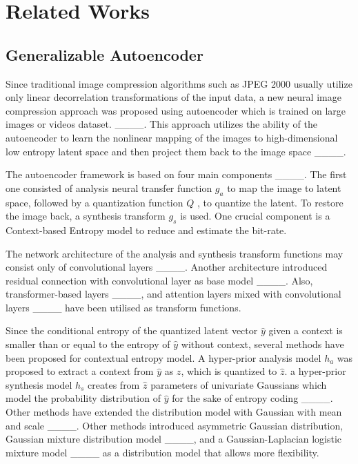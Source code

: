\section{Related Works}
\subsection{Generalizable Autoencoder}\label{sec:Generalizable_Autoencoder}

Since traditional image compression algorithms such as JPEG 2000 usually utilize only linear decorrelation transformations of the input data, a new neural image compression approach was proposed using autoencoder which is trained on large images or videos dataset. ____.  
This approach utilizes the ability of the autoencoder to learn the nonlinear mapping of the images to high-dimensional low entropy latent space and then project them back to the image space ____.  

The autoencoder framework is based on four main components ____. The first one consisted of analysis neural transfer function $g_a$ to map the image to latent space, followed by a quantization function $Q$ , to quantize the latent. To restore the image back, a synthesis transform $g_s$ is used. One crucial component is a Context-based Entropy model to reduce and estimate the bit-rate. 

The network architecture of the analysis and synthesis transform functions may consist only of convolutional layers ____. Another architecture introduced residual connection with convolutional layer as base model ____. Also, transformer-based layers ____, and attention layers mixed with convolutional layers ____ have been utilised as transform functions. 

Since the conditional entropy of the quantized latent vector $\hat{y}$ given a context is smaller than or equal to the entropy of $\hat{y}$ without context, several methods have been proposed for contextual entropy model. A hyper-prior analysis model $h_{a}$ was proposed to extract a context from $\hat{y}$ as $z$, which is quantized to $\hat{z}$. a hyper-prior synthesis model $h_{s}$ creates from $\hat{z}$ parameters of univariate Gaussians which model the probability distribution of $\hat{y}$ for the sake of entropy coding ____. Other methods have extended the distribution model with Gaussian with mean and scale ____. Other methods introduced asymmetric Gaussian distribution, Gaussian mixture distribution model ____, and a Gaussian-Laplacian logistic mixture model ____ as a distribution model that allows more flexibility. 

